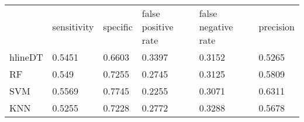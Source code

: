 \begin{table}[!h]
\begin{tabular}{l | l | l| l| l | l}
 & sensitivity & specific & false positive rate & false negative rate & precision \\hlineDT & 0.5451 & 0.6603 & 0.3397 & 0.3152 & 0.5265\\
RF & 0.549 & 0.7255 & 0.2745 & 0.3125 & 0.5809\\
SVM & 0.5569 & 0.7745 & 0.2255 & 0.3071 & 0.6311\\
KNN & 0.5255 & 0.7228 & 0.2772 & 0.3288 & 0.5678\\
\end{tabular}
\caption{}
\end{table}
